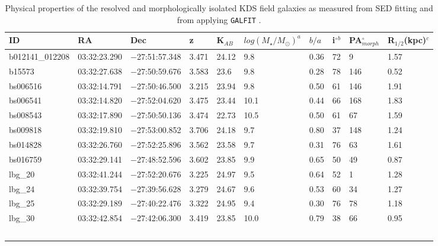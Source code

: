 \documentclass[fleqn,usenatbib]{mnras}
\begin{document}
\begin{table*}
\centering
\begin{threeparttable}
\caption{Physical properties of the resolved and morphologically isolated KDS field galaxies as measured from SED fitting and from applying {\tt GALFIT} \protect\citep{Peng2010_galfit}.}
\label{tab:phys-props}
\begin{tabular}{llllllllll}


 \hline
ID              & RA       & Dec       & z     & K$_{AB}$     & $log(M_{\star}/M_{\odot})^{a}$ & $b/a$ & i$^{\circ}$$^{b}$ & PA$_{morph}^{\circ}$ & R$_{1/2}$(kpc)$^{c}$ \\
 \hline
b012141\_012208 & 03:32:23.290 & $-$27:51:57.348 & 3.471        & 24.12  & 9.8 & 0.36        & 72        & 9     & 1.57      \\
b15573          & 03:32:27.638 & $-$27:50:59.676 & 3.583        & 23.6   & 9.8  & 0.28        & 78        & 146   & 0.52      \\
bs006516        & 03:32:14.791 & $-$27:50:46.500 & 3.215        & 23.94  & 9.8 & 0.50         & 61        & 146   & 1.91      \\
bs006541        & 03:32:14.820 & $-$27:52:04.620 & 3.475       & 23.44  & 10.1  & 0.44        & 66        & 168   & 1.83      \\
bs008543        & 03:32:17.890 & $-$27:50:50.136 & 3.474        & 22.73  & 10.5 & 0.50         & 61        & 67    & 1.59      \\
bs009818        & 03:32:19.810 & $-$27:53:00.852 & 3.706        & 24.18  & 9.7  & 0.80         & 37        & 148   & 1.24      \\
bs014828        & 03:32:26.760 & $-$27:52:25.896 & 3.562        & 23.58  & 9.7  & 0.31        & 76        & 63    & 1.61      \\
bs016759        & 03:32:29.141 & $-$27:48:52.596 & 3.602       & 23.85  & 9.9   & 0.65        & 50        & 49    & 0.87      \\
lbg\_20         & 03:32:41.244 & $-$27:52:20.676 & 3.225        & 24.97  & 9.5  & 0.64        & 52        & 1     & 1.28      \\
lbg\_24         & 03:32:39.754 & $-$27:39:56.628 & 3.279       & 24.67  & 9.6   & 0.53        & 60        & 34    & 1.27      \\
lbg\_25         & 03:32:29.189 & $-$27:40:22.476 & 3.322        & 24.95  & 9.4  & 0.30         & 76        & 78    & 1.18      \\
lbg\_30         & 03:32:42.854 & $-$27:42:06.300 & 3.419        & 23.85  & 10.0  & 0.79         & 38        & 66    & 0.95      \\
$$
\end{tabular}
\end{threeparttable}
\end{table*}
\end{document}
